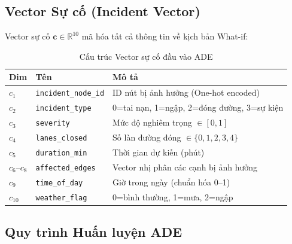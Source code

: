 \subsection{Vector Sự cố (Incident Vector)}

Vector sự cố $\mathbf{c} \in \mathbb{R}^{10}$ mã hóa tất cả thông tin về kịch bản What-if:

\begin{table}[H]
\centering
\caption{Cấu trúc Vector sự cố đầu vào ADE}
\label{tab:incident_vector}
\renewcommand{\arraystretch}{1.4}
\begin{tabular}{>{\centering}p{1.2cm} p{4cm} p{6cm}}
\toprule
\textbf{Dim} & \textbf{Tên} & \textbf{Mô tả} \\
\midrule
$c_1$ & \texttt{incident\_node\_id} & ID nút bị ảnh hưởng (One-hot encoded) \\
\rowcolor{rowgray}
$c_2$ & \texttt{incident\_type} & 0=tai nạn, 1=ngập, 2=đóng đường, 3=sự kiện \\
$c_3$ & \texttt{severity} & Mức độ nghiêm trọng $\in [0,1]$ \\
\rowcolor{rowgray}
$c_4$ & \texttt{lanes\_closed} & Số làn đường đóng $\in \{0,1,2,3,4\}$ \\
$c_5$ & \texttt{duration\_min} & Thời gian dự kiến (phút) \\
\rowcolor{rowgray}
$c_6$--$c_8$ & \texttt{affected\_edges} & Vector nhị phân các cạnh bị ảnh hưởng \\
$c_9$ & \texttt{time\_of\_day} & Giờ trong ngày (chuẩn hóa 0--1) \\
\rowcolor{rowgray}
$c_{10}$ & \texttt{weather\_flag} & 0=bình thường, 1=mưa, 2=ngập \\
\bottomrule
\end{tabular}
\end{table}

\subsection{Quy trình Huấn luyện ADE}

